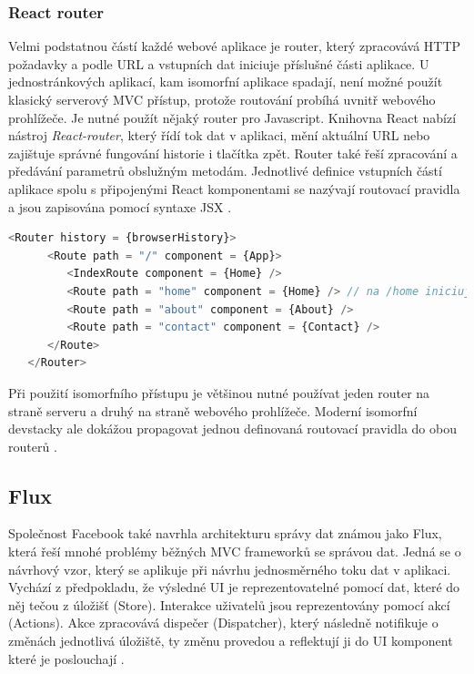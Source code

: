 \subsubsection{React router}
Velmi podstatnou částí každé webové aplikace je router, který zpracovává HTTP požadavky a podle URL a vstupních dat iniciuje příslušné části aplikace. U jednostránkových aplikací, kam isomorfní aplikace spadají, není možné použít klasický serverový MVC přístup, protože routování probíhá uvnitř webového prohlížeče. Je nutné použít nějaký router pro Javascript. Knihovna React nabízí nástroj \textit{React-router}, který řídí tok dat v aplikaci, mění aktuální URL nebo zajištuje správné fungování historie i tlačítka zpět. Router také řeší zpracování a předávání parametrů obslužným metodám. Jednotlivé definice vstupních částí aplikace spolu s připojenými React komponentami se nazývají routovací pravidla a jsou zapisována pomocí syntaxe JSX \cite{react} \cite{react_router}.

\begin{lstlisting}[language=Javascript,caption={Ukázka definice routování pomocí React-router \cite{react_router}}]
   <Router history = {browserHistory}>
      <Route path = "/" component = {App}>
         <IndexRoute component = {Home} />
         <Route path = "home" component = {Home} /> // na /home iniciuj komponentu Home
         <Route path = "about" component = {About} />
         <Route path = "contact" component = {Contact} />
      </Route>
   </Router>
\end{lstlisting}

Při použití isomorfního přístupu je většinou nutné používat jeden router na straně serveru a druhý na straně webového prohlížeče. Moderní isomorfní devstacky ale dokážou propagovat jednou definovaná routovací pravidla do obou routerů \cite{react_book} \cite{react_router}.

\subsection{Flux}
\label{sec:flux}
Společnost Facebook také navrhla architekturu správy dat známou jako Flux, která řeší mnohé problémy běžných MVC frameworků se správou dat. Jedná se o návrhový vzor, který se aplikuje při návrhu jednosměrného toku dat v aplikaci. Vychází z předpokladu, že výsledné UI je reprezentovatelné pomocí dat, které do něj tečou z úložišť (Store). Interakce uživatelů jsou reprezentovány pomocí akcí (Actions). Akce zpracovává dispečer (Dispatcher), který následně notifikuje o změnách jednotlivá úložiště, ty změnu provedou a reflektují ji do UI komponent které je poslouchají \cite{react_book} \cite{flux}.

